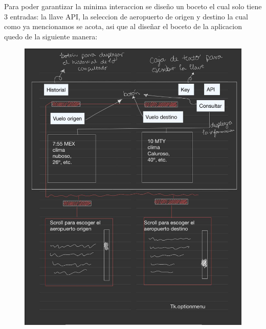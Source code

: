 \documentclass[12pt]{article}
\begin{document}
Para poder garantizar la minima interaccion se diseño un boceto el cual solo tiene 3 entradas: la llave API, la seleccion de aeropuerto de origen y destino la cual como ya mencionamos se acota, asi que al diseñar el boceto de la aplicacion quedo de la siguiente manera:
\newpage
\begin{figure}[h!]
  \centering
  \includegraphics[scale=0.38]{figures/boceto.jpeg}
  \caption{\label{fig:label} }
\end{figure}
\newpage
\end{document}
